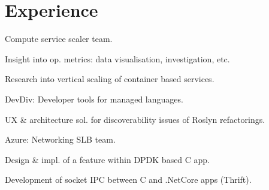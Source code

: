 \documentclass[a4paper]{deedy-resume} %
\begin{document}
\begin{minipage}[t]{0.62\textwidth} %


\section{Experience}


\vspace{\topsep} %
\begin{tightitemize}
\item Compute service scaler team.
\item Insight into op. metrics: data visualisation, investigation, etc.
\item Research into vertical scaling of container based services.
\end{tightitemize}

\sectionspace %



\begin{tightitemize}
\item DevDiv: Developer tools for managed languages.
\item UX \& architecture sol. for discoverability issues of Roslyn refactorings.
\end{tightitemize}

\begin{tightitemize}
\item Azure: Networking SLB team.
\item Design \& impl. of a feature within DPDK based C app.
\item Development of socket IPC between C and .NetCore apps (Thrift).
\end{tightitemize}

\sectionspace %



\end{minipage}
\end{document}
